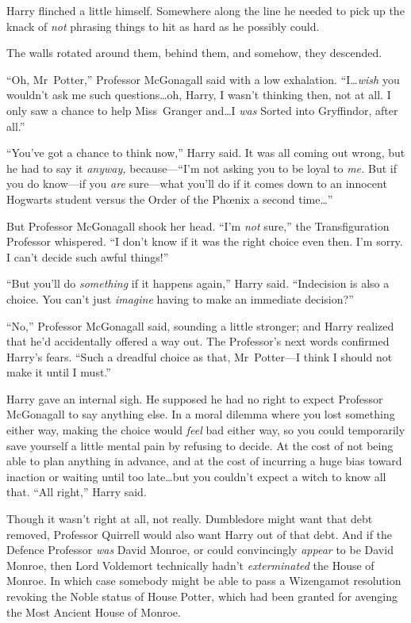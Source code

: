 Harry flinched a little himself. Somewhere along the line he needed to pick up the knack of \emph{not} phrasing things to hit as hard as he possibly could.

The walls rotated around them, behind them, and somehow, they descended.

“Oh, Mr~Potter,” Professor McGonagall said with a low exhalation. “I…\emph{wish} you wouldn’t ask me such questions…oh, Harry, I wasn’t thinking then, not at all. I only saw a chance to help Miss~Granger and…I \emph{was} Sorted into Gryffindor, after all.”

“You’ve got a chance to think now,” Harry said. It was all coming out wrong, but he had to say it \emph{anyway,} because—“I’m not asking you to be loyal to \emph{me.} But if you do know—if you \emph{are} sure—what you’ll do if it comes down to an innocent Hogwarts student versus the Order of the Phœnix a second time…”

But Professor McGonagall shook her head. “I’m \emph{not} sure,” the Transfiguration Professor whispered. “I don’t know if it was the right choice even then. I’m sorry. I can’t decide such awful things!”

“But you’ll do \emph{something} if it happens again,” Harry said. “Indecision is also a choice. You can’t just \emph{imagine} having to make an immediate decision?”

“No,” Professor McGonagall said, sounding a little stronger; and Harry realized that he’d accidentally offered a way out. The Professor’s next words confirmed Harry’s fears. “Such a dreadful choice as that, Mr~Potter—I think I should not make it until I must.”

Harry gave an internal sigh. He supposed he had no right to expect Professor McGonagall to say anything else. In a moral dilemma where you lost something either way, making the choice would \emph{feel} bad either way, so you could temporarily save yourself a little mental pain by refusing to decide. At the cost of not being able to plan anything in advance, and at the cost of incurring a huge bias toward inaction or waiting until too late…but you couldn’t expect a witch to know all that. “All right,” Harry said.

Though it wasn’t right at all, not really. Dumbledore might want that debt removed, Professor Quirrell would also want Harry out of that debt. And if the Defence Professor \emph{was} David Monroe, or could convincingly \emph{appear} to be David Monroe, then Lord Voldemort technically hadn’t \emph{exterminated} the House of Monroe. In which case somebody might be able to pass a Wizengamot resolution revoking the Noble status of House Potter, which had been granted for avenging the Most Ancient House of Monroe.

